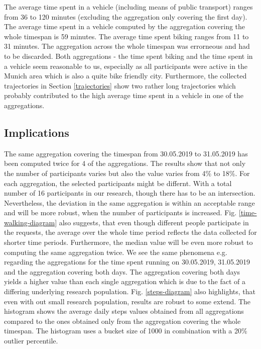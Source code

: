 The average time spent in a vehicle (including means of public transport) ranges from 36 to 120 minutes (excluding the aggregation only covering the first day). The average time spent in a vehicle computed by the aggregation covering the whole timespan is 59 minutes.
The average time spent biking ranges from 11 to 31 minutes. The aggregation across the whole timespan was errorneous and had to be discarded. Both aggregations - the time spent biking and the time spent in a vehicle seem reasonable to us, especially as all participants were active in the Munich area which is also a quite bike friendly city. Furthermore, the collected trajectories in Section \ref{trajectories} show two rather long trajectories which probably contributed to the high average time spent in a vehicle in one of the aggregations.

\subsection{Implications}
The same aggregation covering the timespan from 30.05.2019 to 31.05.2019 has been computed twice for 4 of the aggregations. The results show that not only the number of participants varies but also the value varies from 4\% to 18\%. For each aggregation, the selected participants might be differnt. With a total number of 16 participants in our research, though there has to be an intersection. Nevertheless, the deviation in the same aggregation is within an acceptable range and will be more robust, when the number of participants is increased. Fig. \ref{time-walking-diagram} also suggests, that even though different people participate in the requests, the average over the whole time period reflects the data collected for shorter time periods. Furthermore, the median value will be even more robust to computing the same aggregation twice. We see the same phenomena e.g. regarding the aggregations for the time spent running on 30.05.2019, 31.05.2019 and the aggregation covering both days. The aggregation covering both days yields a higher value than each single aggregation which is due to the fact of a differing underlying research population.
Fig. \ref{steps-diagram} also highlights, that even with out small research population, results are robust to some extend. The histogram shows the average daily steps values obtained from all aggregations compared to the ones obtained only from the aggregation covering the whole timespan. The histogram uses a bucket size of 1000 in combination with a 20\% outlier percentile.

